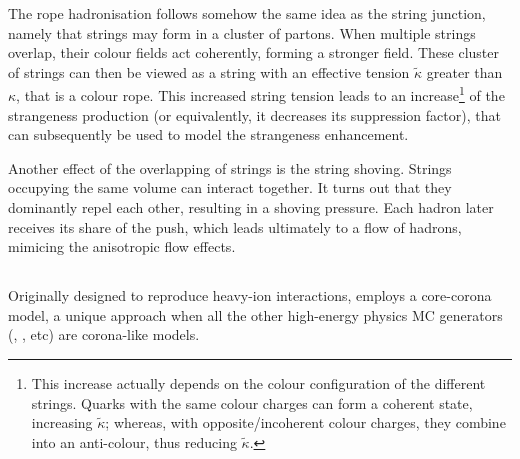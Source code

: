 The rope hadronisation follows somehow the same idea as the string junction, namely that strings may form in a cluster of partons. When multiple strings overlap, their colour fields act coherently, forming a stronger field. These cluster of strings can then be viewed as a string with an effective tension $\tilde{\kappa}$ greater than $\kappa$, that is a colour rope. This increased string tension leads to an increase\footnote{This increase actually depends on the colour configuration of the different strings. Quarks with the same colour charges can form a coherent state, increasing $\tilde{\kappa}$; whereas, with opposite/incoherent colour charges, they combine into an anti-colour, thus reducing $\tilde{\kappa}$.} of the strangeness production (or equivalently, it decreases its suppression factor), that can subsequently be used to model the strangeness enhancement.

Another effect of the overlapping of strings is the string shoving. Strings occupying the same volume can interact together. It turns out that they dominantly repel each other, resulting in a shoving pressure. Each hadron later receives its share of the push, which leads ultimately to a flow of hadrons, mimicing the anisotropic flow effects.

\subsection{\Epos}

Originally designed to reproduce heavy-ion interactions, \Epos employs a core-corona model, a unique approach when all the other high-energy physics MC generators (\Pythia, \Herwig, etc) are corona-like models. 

